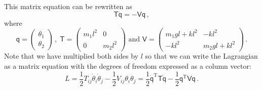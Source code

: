 \documentclass{article}
\theoremstyle{plain}\theoremheaderfont{\normalfont\itshape}\theorembodyfont{\rmfamily}\theoremseparator{.}\newtheorem*{rem}{Remark}\newtheorem*{ex}{Example}\newtheorem*{proof}{Proof}\newtheorem*{altp}{Alternative proof}
\theoremstyle{plain}\theoremheaderfont{\normalfont\bfseries}\theorembodyfont{\rmfamily}\theoremseparator{.}\newtheorem{thm}{Theorem}[section]\newtheorem{lem}[thm]{Lemma}\newtheorem{prop}[thm]{Proposition}\newtheorem*{cor}{Corollary}\newtheorem{defn}[thm]{Definition}\newtheorem{clm}[thm]{Claim}\newtheorem{clminproof}{Claim}
\theoremstyle{break}\theoremheaderfont{\normalfont\itshape}\theorembodyfont{\rmfamily}\theoremseparator{.\medskip}\newtheorem*{proofskip}{Proof}\newtheorem*{exs}{Examples}\newtheorem*{rems}{Remarks}
\theoremstyle{break}\theoremheaderfont{\normalfont\bfseries}\theorembodyfont{\rmfamily}\theoremseparator{.\medskip}\newtheorem{lemskip}[thm]{Lemma}\newtheorem{defnskip}[thm]{Definition}\newtheorem{propskip}[thm]{Proposition}\newtheorem{thmskip}[thm]{Theorem}
\numberwithin{equation}{section}
\newcommand{\tp}{^\mathrm{T}}
\begin{document}
	This matrix equation can be rewritten as
	\[\mathsf{T}\ddot{\mathsf{q}}=-\mathsf{Vq}\,,\]
	where
	\[\mathsf{q}=\begin{pmatrix}
		\theta_1 \\ \theta_2
	\end{pmatrix}\,,\;\mathsf{T}=\begin{pmatrix}
		m_1 l^2 & 0 \\
		0 & m_2 l^2
	\end{pmatrix}\text{ and }\mathsf{V}=\begin{pmatrix}
		m_1gl+kl^2 & -kl^2 \\
		-kl^2 & m_2gl+kl^2
	\end{pmatrix}\,.\]
	Note that we have multiplied both sides by \(l\) so that we can write the Lagrangian as a matrix equation with the degrees of freedom expressed as a column vector:
	\[L=\frac{1}{2}T_{ij}\dot{\theta}_i\dot{\theta}_j-\frac{1}{2}V_{ij}\theta_i\theta_j=\frac{1}{2}\dot{\mathsf{q}}\tp\mathsf{T}\dot{\mathsf{q}}-\frac{1}{2}\mathsf{q\tp Vq}\,.\]
\end{document}
